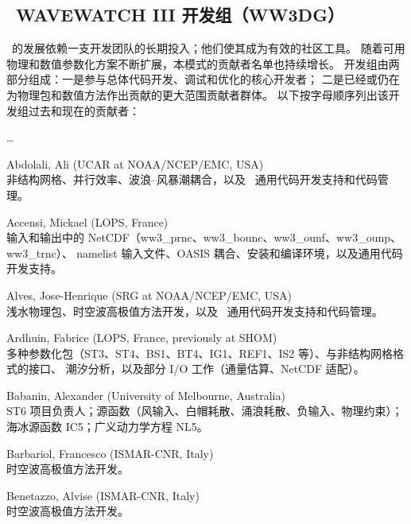 \vssub
\subsection{~WAVEWATCH III\textsuperscript{\textregistered} 开发组（WW3DG）\label{sec:WW3DG}}
\vssub

\ww\ 的发展依赖一支开发团队的长期投入；他们使其成为有效的社区工具。
随着可用物理和数值参数化方案不断扩展，本模式的贡献者名单也持续增长。
开发组由两部分组成：一是参与总体代码开发、调试和优化的核心开发者；
二是已经或仍在为物理包和数值方法作出贡献的更大范围贡献者群体。
以下按字母顺序列出该开发组过去和现在的贡献者：

\begin{list}{\ldots}{ }

\item [Abdolali, Ali] (UCAR at NOAA/NCEP/EMC, USA) \\
  非结构网格、并行效率、波浪--风暴潮耦合，以及 \ws\ 通用代码开发支持和代码管理。

\item [Accensi, Mickael] (LOPS, France) \\
  输入和输出中的 NetCDF（ww3\_prnc、ww3\_bounc、ww3\_ounf、ww3\_ounp、ww3\_trnc）、
  namelist 输入文件、OASIS 耦合、安装和编译环境，以及通用代码开发支持。

\item [Alves, Jose-Henrique] (SRG at NOAA/NCEP/EMC, USA) \\
  浅水物理包、时空波高极值方法开发，以及 \ws\ 通用代码开发支持和代码管理。

\item [Ardhuin, Fabrice] (LOPS, France, previously at SHOM) \\
  多种参数化包（ST3、ST4、BS1、BT4、IG1、REF1、IS2 等）、与非结构网格格式的接口、
  潮汐分析，以及部分 I/O 工作（通量估算、NetCDF 适配）。

\item [Babanin, Alexander] (University of Melbourne, Australia)\\
  ST6 项目负责人；源函数（风输入、白帽耗散、涌浪耗散、负输入、物理约束）；
  海冰源函数 IC5；广义动力学方程 NL5。

\item [Barbariol, Francesco] (ISMAR-CNR, Italy) \\
  时空波高极值方法开发。

\item [Benetazzo, Alvise] (ISMAR-CNR, Italy) \\
  时空波高极值方法开发。


\end{list}
